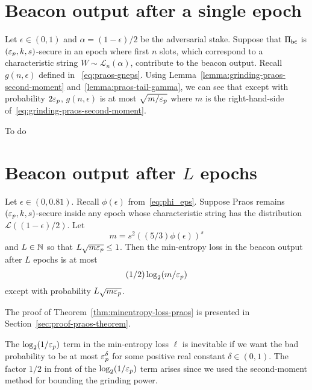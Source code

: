 \section{Beacon output after a single epoch}
Let $\epsilon \in (0,1)$ and $\alpha = (1-\epsilon)/2$ be the adversarial stake.
Suppose that $\Pi_\mathsf{bc}$ is $(\mathsf{\varepsilon}_p, k, s)$-secure in an epoch 
where first $n$ slots, 
which correspond to a characteristic string $W \sim \mathcal{L}_n(\alpha)$, 
contribute to the beacon output.
Recall $g(n,\epsilon)$ defined in ~\eqref{eq:praos-gneps}.
Using Lemma~\ref{lemma:grinding-praos-second-moment} and~\ref{lemma:praos-tail-gamma}, 
we can see that except with probability $2\mathsf{\varepsilon}_p$, $g(n,\epsilon)$ is at most $\sqrt{m/\mathsf{\varepsilon}_p}$ 
where $m$ is the right-hand-side of~\eqref{eq:grinding-praos-second-moment}.

\begin{theorem}\label{thm:praos-gp-single-epoch}
  {\color{red}To do}
\end{theorem}


\section{Beacon output after $L$ epochs}\label{sec:thm-praos-multiepoch}\label{sec:proof-praos-theorem}



\begin{theorem}\label{thm:minentropy-loss-praos-muliti-epochs}  
  Let $\epsilon \in (0,0.81)$. 
  Recall $\phi(\epsilon)$ from~\eqref{eq:phi_eps}.
  Suppose Praos 
  remains $(\mathsf{\varepsilon}_p, k, s)$-secure 
  inside any epoch 
  whose characteristic string has the distribution $\mathcal{L}((1-\epsilon)/2)$. 
  Let 
  $$
    m = s^2 \left( (5/3) \phi(\epsilon) \right)^s
  $$
  and $L \in \mathbb{N}$ so that $L \sqrt{m \mathsf{\varepsilon}_p} \leq 1$. 
  Then 
  the min-entropy loss in 
  the beacon output after $L$ epochs is at most 
  $$
    (1/2) \log_2 (m/\mathsf{\varepsilon}_p)
  $$
  except with probability $L \sqrt{m \mathsf{\varepsilon}_p}$.
\end{theorem}

The proof of Theorem~\ref{thm:minentropy-loss-praos} 
is presented in Section~\ref{sec:proof-praos-theorem}. 

\begin{remark*}
  The $\log_2(1/\mathsf{\varepsilon}_p)$ term in the min-entropy loss $\ell$ 
  is inevitable if we want 
  the bad probability to be at most $\mathsf{\varepsilon}_p^\delta$ 
  for some positive real constant $\delta \in (0, 1)$. 
  The factor $1/2$ in front of the $\log_2(1/\mathsf{\varepsilon}_p)$ term 
  arises since we used the second-moment method 
  for bounding the grinding power.
\end{remark*}


